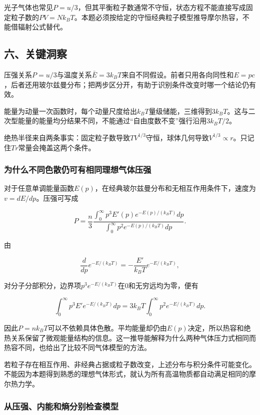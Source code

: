 \documentclass[12pt,a4paper,fontset=fandol]{ctexart}
\begin{document}
光子气体也常见\(P=u/3\)，但其平衡粒子数通常不守恒，状态方程不能直接写成固定粒子数的\(PV=Nk_BT\)。本题必须按给定的守恒经典粒子模型推导摩尔热容，不能借辐射公式替代。

\subsection{六、关键洞察}\label{ux516dux5173ux952eux6d1eux5bdf-6}

压强关系\(P=u/3\)与温度关系\(\bar E=3k_BT\)来自不同假设。前者只用各向同性和\(E=pc\)，后者还用玻尔兹曼分布；把两步区分开，有助于识别条件改变时哪一个结论仍有效。

能量为动量一次函数时，每个动量尺度给出\(k_BT\)量级储能，三维得到\(3k_BT\)。这与二次型能量的能量均分结果不同，不能通过``自由度数不变''强行沿用\(3k_BT/2\)。

绝热半径来自两条事实：固定粒子数导致\(TV^{1/3}\)守恒，球体几何导致\(V^{1/3}\propto r\)。只记住\(Tr\)常量会掩盖这两个条件。

\subsubsection{为什么不同色散仍可有相同理想气体压强}\label{ux4e3aux4ec0ux4e48ux4e0dux540cux8272ux6563ux4ecdux53efux6709ux76f8ux540cux7406ux60f3ux6c14ux4f53ux538bux5f3a}

对于任意单调能量函数\(E(p)\)，在经典玻尔兹曼分布和无相互作用条件下，速度为\(v=dE/dp\)。压强可写成

\[
P=\frac n3
\frac{\int_0^\infty p^3E'(p)e^{-E(p)/(k_BT)}dp}
{\int_0^\infty p^2e^{-E(p)/(k_BT)}dp}.
\]

由

\[
\frac d{dp}e^{-E/(k_BT)}
=-\frac{E'}{k_BT}e^{-E/(k_BT)},
\]

对分子分部积分，边界项\(p^3e^{-E/(k_BT)}\)在0和无穷远均为零，便有

\[
\int_0^\infty p^3E'e^{-E/(k_BT)}dp
=3k_BT\int_0^\infty p^2e^{-E/(k_BT)}dp.
\]

因此\(P=nk_BT\)可以不依赖具体色散。平均能量却仍由\(E(p)\)决定，所以热容和绝热关系保留了微观能量结构的信息。这一推导能解释为什么两种气体压力式相同而热容不同，也给出了比较不同气体模型的方法。

若粒子存在相互作用、非经典占据或粒子数改变，上述分布与积分条件可能变化。不能因为本题得到熟悉的理想气体形式，就认为所有高温物质都自动满足相同的摩尔热力学。

\subsubsection{从压强、内能和熵分别检查模型}\label{ux4eceux538bux5f3aux5185ux80fdux548cux71b5ux5206ux522bux68c0ux67e5ux6a21ux578b}
\end{document}
